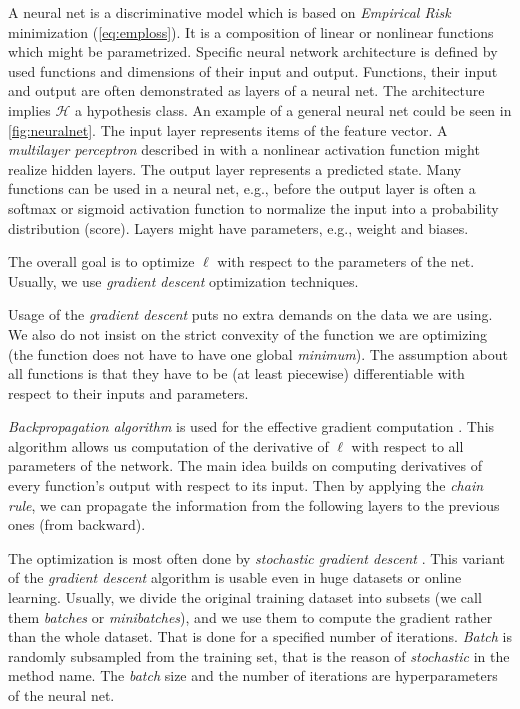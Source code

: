 A neural net is a discriminative model which is based on \emph{Empirical Risk} minimization (\ref{eq:emploss}). It is a composition of linear or nonlinear functions which might be parametrized. Specific neural network architecture is defined by used functions and dimensions of their input and output. Functions, their input and output are often demonstrated as layers of a neural net. The architecture implies $\mathcal{H}$ a hypothesis class. An example of a general neural net could be seen in \ref{fig:neuralnet}. The input layer represents items of the feature vector. A \emph{multilayer perceptron} described in \cite{Russell2009} with a nonlinear activation function might realize hidden layers. The output layer represents a predicted state. Many functions can be used in a neural net, e.g., before the output layer is often a softmax or sigmoid activation function to normalize the input into a probability distribution (score). Layers might have parameters, e.g., weight and biases.

The overall goal is to optimize $\ell$ with respect to the parameters of the net. Usually, we use \emph{gradient descent} optimization techniques.

Usage of the \emph{gradient descent} puts no extra demands on the data we are using. We also do not insist on the strict convexity of the function we are optimizing (the function does not have to have one global \emph{minimum}). The assumption about all functions is that they have to be (at least piecewise) differentiable with respect to their inputs and parameters. 

\emph{Backpropagation algorithm} is used for the effective gradient computation \cite{Rumelhart1988}. This algorithm allows us computation of the derivative of $\ell$ with respect to all parameters of the network. The main idea builds on computing derivatives of every function's output with respect to its input. Then by applying the \emph{chain rule}, we can propagate the information from the following layers to the previous ones (from backward).

The optimization is most often done by \emph{stochastic gradient descent} \cite{Kiefer1952}. This variant of the \emph{gradient descent} algorithm is usable even in huge datasets or online learning. Usually, we divide the original training dataset into subsets (we call them \emph{batches} or \emph{minibatches}), and we use them to compute the gradient rather than the whole dataset. That is done for a specified number of iterations. \emph{Batch} is randomly subsampled from the training set, that is the reason of \emph{stochastic} in the method name. The \emph{batch} size and the number of iterations are hyperparameters of the neural net.

